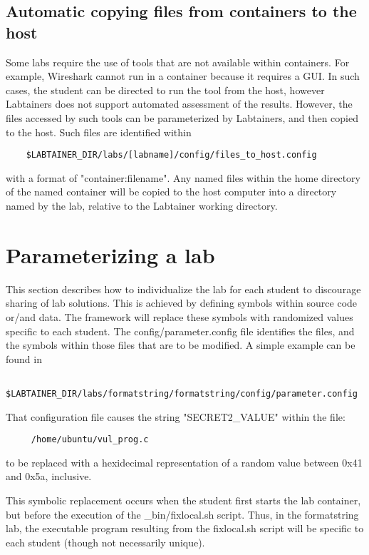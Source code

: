 \documentclass[12pt]{article}
\begin{document}
\subsection{Automatic copying files from containers to the host}
Some labs require the use of tools that are not available within containers. For example,
Wireshark cannot run in a container because it requires a GUI.  In such cases, the
student can be directed to run the tool from the host, however Labtainers does not support
automated assessment of the results.  However, the files accessed by such tools can be
parameterized by Labtainers, and then copied to the host.  Such files are identified within
\begin{verbatim}
    $LABTAINER_DIR/labs/[labname]/config/files_to_host.config
\end{verbatim}
\noindent with a format of "container:filename".  Any named files within the home directory of
the named container will be copied to the host computer into a directory named by the lab, relative
to the Labtainer working directory.

\section{Parameterizing a lab}
This section describes how to individualize the lab for each student to discourage
sharing of lab solutions.  This is achieved by defining symbols within source 
code or/and data.  The framework will replace these symbols with randomized values
specific to each student.  The config/parameter.config file identifies the files, and
the symbols within those files that are to be modified.  A simple example can be found in 
\begin{verbatim}
    $LABTAINER_DIR/labs/formatstring/formatstring/config/parameter.config
\end{verbatim}

That configuration file causes the string "SECRET2\_VALUE" within the file:
\begin{verbatim}
     /home/ubuntu/vul_prog.c
\end{verbatim}
to be replaced with a hexidecimal representation of a random value
between 0x41 and 0x5a, inclusive.

This symbolic replacement occurs when the student first starts the lab container,
but before the execution of the \_bin/fixlocal.sh script.  Thus, in the formatstring
lab, the executable program resulting from the fixlocal.sh script will be specific
to each student (though not necessarily unique).
\end{document}
